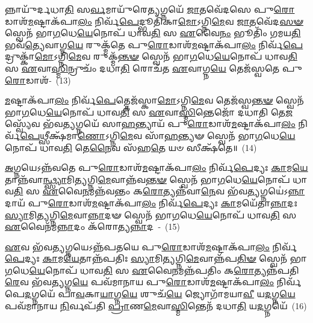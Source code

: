 𑌨𑍍𑌨𑌾𑌯𑍁᳴𑌰𑍍𑌦𑌧𑌾\-\ul{𑌤𑌿} 𑌸\-\ul{𑌰𑍍𑌵}\-𑌮𑌾𑌯𑍁᳴𑌰𑍇\-\ul{𑌤𑍍𑌯}\-𑌗𑍍𑌨𑌯𑍇᳴ \ul{𑌜𑌾}\-𑌤𑌵𑍇᳴𑌦𑌸𑍇 𑌪𑍁\-\ul{𑌰𑍋}\-𑌡𑌾𑌶᳴\-\-\ul{𑌮}\-𑌷𑍍𑌟𑌾\-𑌕᳴𑌪𑌾\-\ul{𑌲𑌂} 𑌨𑌿𑌰𑍍𑌵᳴\-\ul{𑌪𑍇}\-𑌦𑍍𑌭𑍂𑌤𑌿᳴𑌕𑌾\-\ul{𑌮𑍋}\-\-𑌽𑌗𑍍𑌨𑌿\-\ul{𑌮𑍇}\-𑌵 \ul{𑌜𑌾}\-𑌤𑌵𑍇᳴𑌦\-\ul{𑌸}\-\-\ul{𑍟} 𑌸𑍍𑌵𑍇𑌨᳴ 𑌭𑌾\-\ul{𑌗}\-𑌧𑍇\-\ul{𑌯𑍇}\-𑌨𑍋𑌪᳴ 𑌧𑌾𑌵\-\ul{𑌤𑌿} 𑌸 \ul{𑌏}\-𑌵𑍈\-\ul{𑌨𑌂} 𑌭𑍂𑌤𑌿𑌂᳴ 𑌗𑌮𑌯\-\ul{𑌤𑌿} 𑌭𑌵᳴\-\ul{𑌤𑍍𑌯𑍇}\-𑌵𑌾𑌗𑍍𑌨\-\ul{𑌯𑍇} 𑌰𑍁𑌕𑍍𑌮᳴𑌤𑍇 𑌪𑍁\-\ul{𑌰𑍋}\-𑌡𑌾𑌶᳴\-\-\ul{𑌮}\-𑌷𑍍𑌟𑌾\-𑌕᳴𑌪𑌾\-\ul{𑌲𑌂} 𑌨𑌿𑌰𑍍𑌵᳴\-\ul{𑌪𑍇}\-𑌦𑍍𑌰𑍁𑌕𑍍𑌕𑌾᳴\-\ul{𑌮𑍋}\-\-𑌽𑌗𑍍𑌨𑌿\-\ul{𑌮𑍇}\-𑌵 𑌰𑍁𑌕𑍍𑌮᳴\-\ul{𑌨𑍍𑌤}\-\-\ul{𑍟} 𑌸𑍍𑌵𑍇𑌨᳴ 𑌭𑌾\-\ul{𑌗}\-𑌧𑍇\-\ul{𑌯𑍇}\-𑌨𑍋𑌪᳴ 𑌧𑌾𑌵\-\ul{𑌤𑌿} 𑌸 \ul{𑌏}\-𑌵𑌾\-\ul{𑌸𑍍𑌮𑌿}\-𑌨𑍍𑌰𑍁𑌚𑌂᳴ 𑌦𑌧𑌾\-\ul{𑌤𑌿} 𑌰𑍋𑌚᳴𑌤 \ul{𑌏}\-𑌵𑌾𑌗𑍍𑌨\-\ul{𑌯𑍇} 𑌤𑍇𑌜᳴𑌸𑍍𑌵𑌤𑍇 𑌪𑍁\-\ul{𑌰𑍋}\-𑌡𑌾𑌶᳴-~(13)

\-\ul{𑌮}\-𑌷𑍍𑌟𑌾\-𑌕᳴𑌪𑌾\-\ul{𑌲𑌂} 𑌨𑌿𑌰𑍍𑌵᳴\-\ul{𑌪𑍇}\-𑌤𑍍𑌤𑍇𑌜᳴𑌸𑍍𑌕𑌾\-\ul{𑌮𑍋}\-\-𑌽𑌗𑍍𑌨𑌿\-\ul{𑌮𑍇}\-𑌵 𑌤𑍇𑌜᳴𑌸𑍍𑌵\-\ul{𑌨𑍍𑌤}\-\-\ul{𑍟} 𑌸𑍍𑌵𑍇𑌨᳴ 𑌭𑌾\-\ul{𑌗}\-𑌧𑍇\-\ul{𑌯𑍇}\-𑌨𑍋𑌪᳴ 𑌧𑌾𑌵\-\ul{𑌤𑌿} 𑌸 \ul{𑌏}\-𑌵𑌾\-\ul{𑌸𑍍𑌮𑌿}\-𑌨𑍍𑌤𑍇𑌜𑍋᳴ 𑌦𑌧𑌾𑌤𑌿 𑌤𑍇\-\ul{𑌜}\-𑌸𑍍𑌵𑍍𑌯𑍇᳴𑌵 𑌭᳴𑌵\-\ul{𑌤𑍍𑌯}\-𑌗𑍍𑌨𑌯𑍇᳴ 𑌸𑌾\-\ul{𑌹}\-𑌨𑍍𑌤𑍍𑌯𑌾𑌯᳴ 𑌪𑍁\-\ul{𑌰𑍋}\-𑌡𑌾𑌶᳴\-\-\ul{𑌮}\-𑌷𑍍𑌟𑌾\-𑌕᳴𑌪𑌾\-\ul{𑌲𑌂} 𑌨𑌿𑌰𑍍𑌵᳴\-\ul{𑌪𑍇}\-𑌥𑍍𑌸𑍀𑌕𑍍𑌷᳴𑌮𑌾\-\ul{𑌣𑍋}\-\-𑌽𑌗𑍍𑌨𑌿\-\ul{𑌮𑍇}\-𑌵 𑌸𑌾᳴\-\ul{𑌹}\-𑌨𑍍𑌤𑍍𑌯𑍟 𑌸𑍍𑌵𑍇𑌨᳴ 𑌭𑌾\-\ul{𑌗}\-𑌧𑍇\-\ul{𑌯𑍇}\-𑌨𑍋𑌪᳴ 𑌧𑌾𑌵\-\ul{𑌤𑌿} 𑌤𑍇\-\ul{𑌨𑍈}\-𑌵 𑌸᳴𑌹\-\ul{𑌤𑍇} 𑌯𑍞 𑌸𑍀𑌕𑍍𑌷᳴𑌤𑍇॥~(14)

{\anuvakamend[{𑌭𑍍𑌰𑌾𑌤𑍃᳴𑌵𑍍𑌯𑌸𑍍𑌯𑌾\-\ul{𑌸𑍍𑌮𑌿}\-𑌨𑍍𑌤𑍇𑌜᳴𑌸𑍍𑌵𑌤𑍇 𑌪𑍁\-\ul{𑌰𑍋}\-𑌡𑌾𑌶᳴\-\-\ul{𑌮}\-𑌷𑍍𑌟𑌾𑌤𑍍𑌰𑌿𑍞᳴𑌶𑌚𑍍𑌚}]}%

\-\ul{𑌅}\-𑌗𑍍𑌨𑌯𑍇\-𑌽𑌨𑍍𑌨᳴𑌵𑌤𑍇 𑌪𑍁\-\ul{𑌰𑍋}\-𑌡𑌾𑌶᳴\-\-\ul{𑌮}\-𑌷𑍍𑌟𑌾\-𑌕᳴𑌪𑌾\-\ul{𑌲𑌂} 𑌨𑌿𑌰𑍍𑌵᳴\-\ul{𑌪𑍇}\-𑌦𑍍𑌯𑌃 \ul{𑌕𑌾}\-𑌮\-\ul{𑌯𑍇}\-𑌤𑌾𑌨𑍍𑌨᳴\-𑌵𑌾\-\ul{𑌨𑍍𑌥𑍍𑌸𑍍𑌯𑌾}\-𑌮𑌿\-\ul{𑌤𑍍𑌯}\-𑌗𑍍𑌨𑌿\-\-\ul{𑌮𑍇}\-𑌵𑌾𑌨𑍍𑌨᳴𑌵\-\ul{𑌨𑍍𑌤}\-\-\ul{𑍟} 𑌸𑍍𑌵𑍇𑌨᳴ 𑌭𑌾\-\ul{𑌗}\-𑌧𑍇\-\ul{𑌯𑍇}\-𑌨𑍋𑌪᳴ 𑌧𑌾𑌵\-\ul{𑌤𑌿} 𑌸 \ul{𑌏}\-𑌵𑍈\-\ul{𑌨}\-𑌮𑌨𑍍𑌨᳴𑌵𑌨𑍍𑌤𑌂 𑌕\-\ul{𑌰𑍋}\-𑌤𑍍𑌯𑌨𑍍𑌨᳴𑌵𑌾\-\ul{𑌨𑍇}\-𑌵 𑌭᳴𑌵\-\ul{𑌤𑍍𑌯}\-𑌗𑍍𑌨𑌯𑍇॑\-𑌽\-\ul{𑌨𑍍𑌨𑌾}\-𑌦𑌾𑌯᳴ 𑌪𑍁\-\ul{𑌰𑍋}\-𑌡𑌾𑌶᳴\-\-\ul{𑌮}\-𑌷𑍍𑌟𑌾𑌕᳴𑌪𑌾\-\ul{𑌲𑌂} 𑌨𑌿𑌰𑍍𑌵᳴\-\ul{𑌪𑍇}\-𑌦𑍍𑌯𑌃 \ul{𑌕𑌾}\-𑌮𑌯𑍇᳴𑌤𑌾\-\ul{𑌨𑍍𑌨𑌾}\-𑌦𑌃 \ul{𑌸𑍍𑌯𑌾}\-𑌮𑌿\-\ul{𑌤𑍍𑌯}\-𑌗𑍍𑌨𑌿\-\ul{𑌮𑍇}\-𑌵𑌾\-\ul{𑌨𑍍𑌨𑌾}\-𑌦𑍟 𑌸𑍍𑌵𑍇𑌨᳴ 𑌭𑌾\-\ul{𑌗}\-𑌧𑍇\-\ul{𑌯𑍇}\-𑌨𑍋𑌪᳴ 𑌧𑌾𑌵\-\ul{𑌤𑌿} 𑌸 \ul{𑌏}\-𑌵𑍈𑌨᳴𑌮\-\ul{𑌨𑍍𑌨𑌾}\-𑌦𑌂 𑌕᳴𑌰𑍋𑌤𑍍𑌯\-\ul{𑌨𑍍𑌨𑌾}\-𑌦~-~(15)

\-\ul{𑌏}\-𑌵 𑌭᳴𑌵\-\ul{𑌤𑍍𑌯}\-𑌗𑍍𑌨𑌯𑍇\-𑌽𑌨𑍍𑌨᳴𑌪𑌤𑌯𑍇 𑌪𑍁\-\ul{𑌰𑍋}\-𑌡𑌾𑌶᳴\-\-\ul{𑌮}\-𑌷𑍍𑌟𑌾\-𑌕᳴𑌪𑌾\-\ul{𑌲𑌂} 𑌨𑌿𑌰𑍍𑌵᳴\-\ul{𑌪𑍇}\-𑌦𑍍𑌯𑌃 \ul{𑌕𑌾}\-𑌮\-\ul{𑌯𑍇}\-𑌤𑌾𑌨𑍍𑌨᳴𑌪𑌤𑌿𑌃 \ul{𑌸𑍍𑌯𑌾}\-𑌮𑌿\-\ul{𑌤𑍍𑌯}\-𑌗𑍍𑌨𑌿\-\ul{𑌮𑍇}\-𑌵𑌾𑌨𑍍𑌨᳴𑌪\-\ul{𑌤𑌿}\-\-\ul{𑍟} 𑌸𑍍𑌵𑍇𑌨᳴ 𑌭𑌾\-\ul{𑌗}\-𑌧𑍇\-\ul{𑌯𑍇}\-𑌨𑍋𑌪᳴ 𑌧𑌾𑌵\-\ul{𑌤𑌿} 𑌸 \ul{𑌏}\-𑌵𑍈\-\ul{𑌨}\-𑌮𑌨𑍍𑌨᳴𑌪𑌤𑌿𑌂 𑌕\-\ul{𑌰𑍋}\-𑌤𑍍𑌯𑌨𑍍𑌨᳴𑌪𑌤𑌿\-\ul{𑌰𑍇}\-𑌵 𑌭᳴𑌵\-\ul{𑌤𑍍𑌯}\-𑌗𑍍𑌨\-\ul{𑌯𑍇} 𑌪𑌵᳴𑌮𑌾𑌨𑌾𑌯 𑌪𑍁\-\ul{𑌰𑍋}\-𑌡𑌾𑌶᳴\-\-\ul{𑌮}\-𑌷𑍍𑌟𑌾\-𑌕᳴𑌪𑌾\-\ul{𑌲𑌂} 𑌨𑌿𑌰𑍍𑌵᳴𑌪𑍇\-\ul{𑌦}\-𑌗𑍍𑌨𑌯𑍇᳴ 𑌪𑌾\-\ul{𑌵}\-𑌕𑌾\-\ul{𑌯𑌾}\-𑌗𑍍𑌨\-\ul{𑌯𑍇} 𑌶𑍁𑌚᳴\-\ul{𑌯𑍇} 𑌜𑍍𑌯𑍋𑌗𑌾᳴𑌮𑌯𑌾\-\ul{𑌵𑍀} 𑌯\-\ul{𑌦}\-𑌗𑍍𑌨\-\ul{𑌯𑍇} 𑌪𑌵᳴𑌮𑌾𑌨𑌾𑌯 \ul{𑌨𑌿}\-𑌰𑍍𑌵𑌪᳴𑌤𑌿 \ul{𑌪𑍍𑌰𑌾}\-𑌣\-\ul{𑌮𑍇}\-𑌵𑌾\-\ul{𑌸𑍍𑌮𑌿}\-𑌨𑍍𑌤𑍇𑌨᳴ 𑌦𑌧𑌾\-\ul{𑌤𑌿} 𑌯\-\ul{𑌦}\-𑌗𑍍𑌨𑌯𑍇᳴~(16)

